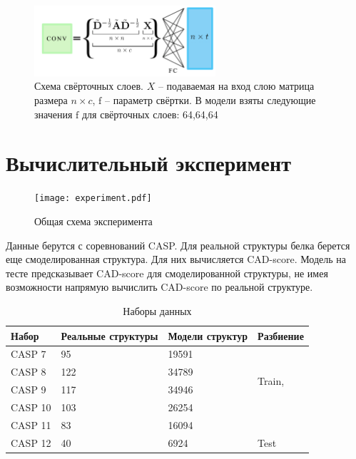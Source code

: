 \documentclass[14pt]{extarticle}
\begin{document}
\begin{figure}[h]
	\centering
	\includegraphics[width=0.6\textwidth]{conv_layer.pdf}
	\caption{Схема свёрточных слоев. $X$ -- подаваемая на вход слою матрица размера $n\times c$, $\text{f}$ -- параметр свёртки. В модели взяты следующие значения $\text{f}$ для свёрточных слоев: 64,64,64}
	\label{fig:convlayer}
\end{figure}

\section{Вычислительный эксперимент}


\begin{figure}[h]
	\centering
	\texttt{[image: experiment.pdf]}
	\caption{Общая схема эксперимента}
	\label{fig:experiment}
\end{figure}

Данные берутся с соревнований CASP. Для реальной структуры белка берется еще смоделированная структура. Для них вычисляется CAD-score. Модель на тесте предсказывает CAD-score для смоделированной структуры, не имея возможности напрямую вычислить CAD-score по реальной структуре.

\begin{table}[H]

		\centering
		\begin{tabular}{p{28mm}|p{26mm}p{26mm}|p{28mm}}
			\hline Набор & Реальные структуры & Модели структур& Разбиение\\
			\hline CASP 7 & 95 & 19591 & \\
			CASP 8 & 122 & 34789 &  \multirow{2}{*}{Train,} \\
			CASP 9 & 117 & 34946 &  \multirow{2}{*}{Validation}\\
			CASP 10 & 103 & 26254 & \\
			CASP 11 & 83 & 16094 &  \\
			\hline 
			CASP 12 & 40 & 6924 & {Test} \\
			\hline
		\end{tabular}
		\caption{Наборы данных}
		\label{table:student}
\end{table}
\end{document}
